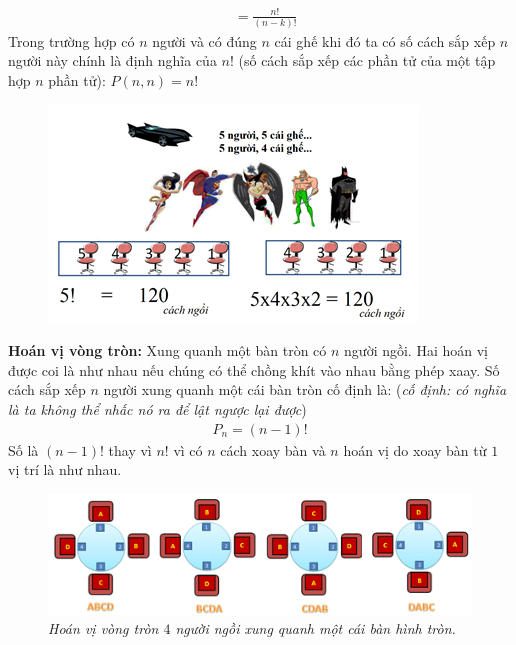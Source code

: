 \begin{multicols}{2}
\begin{align*}
		&= \frac{n!}{(n-k)!} 
	\end{align*}
	\vskip 0.1cm
	Trong trường hợp có $n$ người và có đúng $n$ cái ghế khi đó ta có số cách sắp xếp $n$ người này chính là định nghĩa của $n!$ (số cách sắp xếp các phần tử của một tập hợp $n$ phần tử): $P(n,n)=n!$
	\begin{figure}[H]
		\centering
		\vspace*{-10pt}
		\captionsetup{labelformat=empty, justification=centering}
		\includegraphics[width=1\linewidth]{_4}
		\vspace*{-15pt}
	\end{figure}
	{\textbf{\color{toancuabi}Hoán vị vòng tròn:}} Xung quanh một bàn tròn có $n$ người ngồi. Hai hoán vị được coi là như nhau nếu chúng có thể chồng khít vào nhau bằng phép xaay. Số cách sắp xếp $n$ người xung quanh một cái bàn tròn cố định là: (\textit{cố định: có nghĩa là ta không thể nhấc nó ra để lật ngược lại được})
	\begin{align*}
		P_n=(n-1)!
	\end{align*}
	Số là $(n-1)!$ thay vì $n!$ vì có $n$ cách xoay bàn và $n$ hoán vị do xoay bàn từ $1$ vị trí là như nhau.
	\begin{figure}[H]
		\centering
		\vspace*{5pt}
		\captionsetup{labelformat=empty, justification=centering}
		\includegraphics[width=1\linewidth]{_5}
		\caption{\small\textit{\color{toancuabi}Hoán vị vòng tròn $4$ người ngồi xung quanh một cái bàn hình tròn.}}

\end{figure}
\end{multicols}
